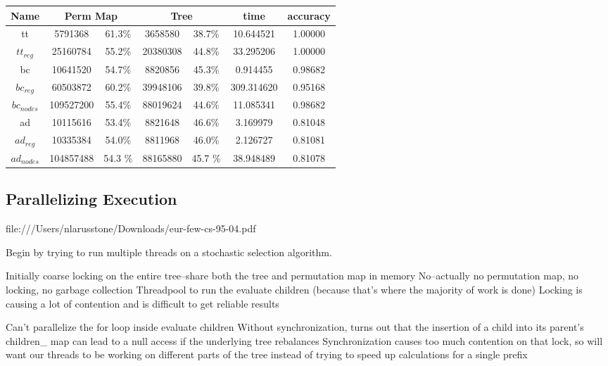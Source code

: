\documentclass[]{article}
\begin{document}
\begin{center}
\begin{tabular} { |c|c|c|c|c|c|c| }
\hline
Name & \multicolumn{2}{c|}{Perm Map} & \multicolumn{2}{c|}{Tree} & time & accuracy \\
\hline

tt & 5791368 & 61.3\%  & 3658580 & 38.7\% & 10.644521 & 1.00000 \\

$tt_{reg}$ & 25160784 & 55.2\% & 20380308 & 44.8\% & 33.295206 & 1.00000 \\

bc & 10641520 & 54.7\% &8820856 & 45.3\% & 0.914455 & 0.98682 \\

$bc_{reg}$ & 60503872 & 60.2\% & 39948106 & 39.8\% & 309.314620 & 0.95168 \\

$bc_{nodes}$ & 109527200 & 55.4\% & 88019624 & 44.6\% & 11.085341 & 0.98682 \\

ad & 10115616 & 53.4\% & 8821648 & 46.6\% & 3.169979 & 0.81048 \\

$ad_{reg}$ & 10335384 & 54.0\% & 8811968 & 46.0\% & 2.126727 & 0.81081 \\

$ad_{nodes}$ & 104857488 & 54.3 \% & 88165880 & 45.7 \% & 38.948489 &  0.81078\\
\hline
\end{tabular}
\end{center}

\subsection{Parallelizing Execution}

file:///Users/nlarusstone/Downloads/eur-few-cs-95-04.pdf

Begin by trying to run multiple threads on a stochastic selection algorithm.

Initially coarse locking on the entire tree--share both the tree and permutation map in memory
No--actually no permutation map, no locking, no garbage collection
	Threadpool to run the evaluate children (because that's where the majority of work is done)
	Locking is causing a lot of contention and is difficult to get reliable results

Can't parallelize the for loop inside evaluate children
	Without synchronization, turns out that the insertion of a child into its parent's children\_ map can lead to a null access if the underlying tree rebalances
	Synchronization causes too much contention on that lock, so will want our threads to be working on different parts of the tree instead of trying to speed up calculations for a single prefix
\end{document}
